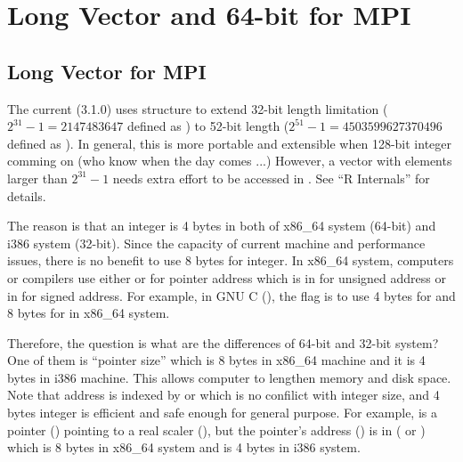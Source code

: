 
\section[Long Vector and 64-bit for MPI]{Long Vector and 64-bit for MPI}
\label{sec:long_vector}

\subsection{Long Vector for MPI}
The current  (3.1.0) uses  structure to extend
32-bit length limitation ($2^{31} - 1 = 2147483647$ defined as
) to 52-bit length ($2^{51} - 1 = 4503599627370496$
defined as ).
In general, this is more portable and extensible when 128-bit integer
comming on (who know when the day comes ...)
However, a vector with elements
larger than $2^{31} - 1$ needs extra effort to be accessed in
.
See ``R Internals'' for details.

The reason is that an integer is 4 bytes in both of
x86\_64 system (64-bit) and i386 system (32-bit).
Since the capacity of current machine and performance issues, there is no
benefit to use 8 bytes for integer.
In x86\_64 system, computers or compilers use either  or
 for pointer address which is in  for unsigned
address or in  for signed address.
For example, in GNU C (), the flag  is to
use 4 bytes for  and 8 bytes for 
in x86\_64 system.

Therefore, the question is what are the differences of 64-bit and
32-bit system? One of them is ``pointer size''
which is 8 bytes in x86\_64 machine and it is 4 bytes in i386 machine.
This allows computer to lengthen memory and disk space.
Note that address is indexed by  or  which is no
confilict with integer size, and 4 bytes integer is efficient and safe enough
for general purpose.
For example,  is a pointer () pointing to a real
scaler (), but the pointer's address () is in
 ( or )
which is 8 bytes in x86\_64 system and is 4 bytes in i386 system.


